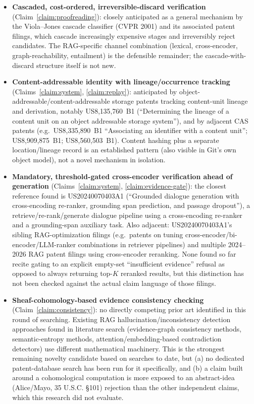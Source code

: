 \begin{itemize}
  \item \textbf{Cascaded, cost-ordered, irreversible-discard verification} (Claim~\ref{claim:proofreading}): closely anticipated as a general mechanism by the Viola--Jones cascade classifier (CVPR 2001) and its associated patent filings, which cascade increasingly expensive stages and irreversibly reject candidates. The RAG-specific channel combination (lexical, cross-encoder, graph-reachability, entailment) is the defensible remainder; the cascade-with-discard structure itself is not new.
  \item \textbf{Content-addressable identity with lineage/occurrence tracking} (Claims~\ref{claim:system}, \ref{claim:replay}): anticipated by object-addressable/content-addressable storage patents tracking content-unit lineage and derivation, notably US8,135,760~B1 (``Determining the lineage of a content unit on an object addressable storage system''), and by adjacent CAS patents (e.g.\ US8,335,890~B1 ``Associating an identifier with a content unit''; US8,909,875~B1; US8,560,503~B1). Content hashing plus a separate location/lineage record is an established pattern (also visible in Git's own object model), not a novel mechanism in isolation.
  \item \textbf{Mandatory, threshold-gated cross-encoder verification ahead of generation} (Claims~\ref{claim:system}, \ref{claim:evidence-gate}): the closest reference found is US20240070403A1 (``Grounded dialogue generation with cross-encoding re-ranker, grounding span prediction, and passage dropout''), a retrieve/re-rank/generate dialogue pipeline using a cross-encoding re-ranker and a grounding-span auxiliary task. Also adjacent: US20240070403A1's sibling RAG-optimization filings (e.g.\ patents on tuning cross-encoder/bi-encoder/LLM-ranker combinations in retriever pipelines) and multiple 2024--2026 RAG patent filings using cross-encoder reranking. None found so far recite gating to an explicit empty-set ``insufficient evidence'' refusal as opposed to always returning top-$K$ reranked results, but this distinction has not been checked against the actual claim language of those filings.
  \item \textbf{Sheaf-cohomology-based evidence consistency checking} (Claim~\ref{claim:consistency}): no directly competing prior art identified in this round of searching. Existing RAG hallucination/inconsistency detection approaches found in literature search (evidence-graph consistency methods, semantic-entropy methods, attention/embedding-based contradiction detectors) use different mathematical machinery. This is the strongest remaining novelty candidate based on searches to date, but (a) no dedicated patent-database search has been run for it specifically, and (b) a claim built around a cohomological computation is more exposed to an abstract-idea (Alice/Mayo, 35 U.S.C. \S 101) rejection than the other independent claims, which this research did not evaluate.

\end{itemize}
